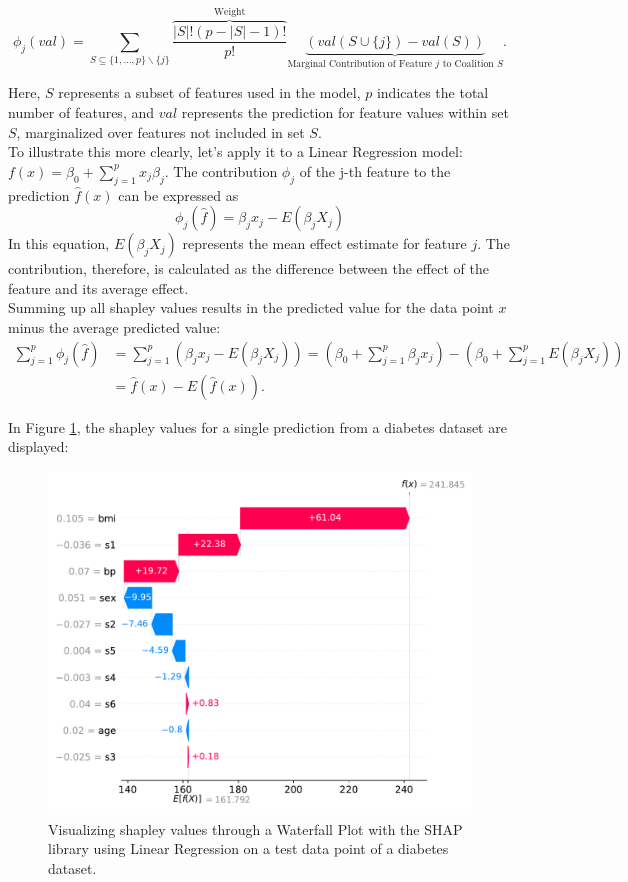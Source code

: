 \begin{equation}
    \phi_j(val)=\sum_{S\subseteq \{1,\dots ,p\}\backslash\{j\}} \overbrace{\dfrac{|S|!(p-|S|-1)!}{p!}}^{\text{Weight}} \underbrace{(val(S\cup \{j\})-val(S))}_{\text{Marginal Contribution of Feature } j \text{ to Coalition } S}.
\end{equation}

Here, $S$ represents a subset of features used in the model, $p$ indicates the total number of features, and $val$ represents the prediction for feature values within set $S$, marginalized over features not included in set $S$. \\
To illustrate this more clearly, let's apply it to a Linear Regression model: $f(x) = \beta_0 + \sum_{j=1}^p x_j\beta_j$. The contribution $\phi_j$ of the j-th feature to the prediction $\hat{f}(x)$ can be expressed as
\begin{equation}
    \phi_j(\hat{f}) = \beta_j x_j - E(\beta_j X_j)
\end{equation}
In this equation, $E(\beta_j X_j)$ represents the mean effect estimate for feature $j$. The contribution, therefore, is calculated as the difference between the effect of the feature and its average effect.\\
Summing up all shapley values results in the predicted value for the data point $x$ minus the average predicted value:
\begin{equation}
\begin{split}
    \sum_{j=1}^p\phi_j(\hat{f})&=\sum_{j=1}^p(\beta_j x_j - E(\beta_j X_j)) = (\beta_0 + \sum_{j=1}^p\beta_j x_j) -(\beta_0 + \sum_{j=1}^p E(\beta_j X_j)) \\
    &= \hat{f}(x) - E(\hat{f}(x)).
\end{split}
\end{equation}

In Figure \ref{fig:shapley}, the shapley values for a single prediction from a diabetes dataset are displayed:

\begin{figure}[H]
    \centering
    \includegraphics[width=0.8\linewidth]{pics/shap_waterfall.pdf}
    \caption{Visualizing shapley values through a Waterfall Plot with the SHAP library using Linear Regression on a test data point of a diabetes dataset.}
    \label{fig:shapley}
\end{figure}

